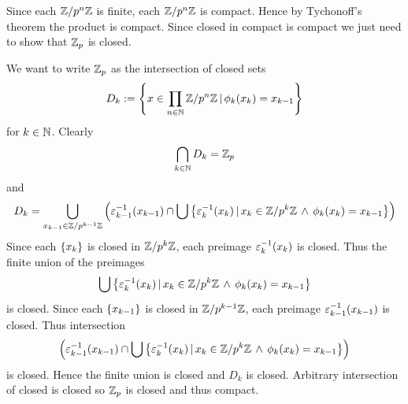 \begin{prop}[$\Z_p$ is compact]
    Since each $\mathbb{Z}/p^{n}\mathbb{Z}$ is finite, 
    each $\mathbb{Z}/p^{n}\mathbb{Z}$ is compact.
    Hence by Tychonoff's theorem
    the product is compact.
    Since closed in compact is compact
    we just need to show that $\Z_p$ is closed.

    We want to write $\Z_p$ as the intersection of 
    closed sets 
    \[D_k:= \left\{x \in \prod_{n\in\mathbb{N}} \mathbb{Z}/p^{n}\mathbb{Z} \,|\, \phi_k (x_k) = x_{k-1}\right\}\]
    for $k \in \mathbb{N}$.
    Clearly 
    \[\bigcap_{k\in\mathbb{N}} D_k = \mathbb{Z}_p\]
    and 
    \[D_k = \bigcup_{x_{k-1} \in \mathbb{Z}/p^{k-1}\mathbb{Z}} \left(\varepsilon_{k-1}^{-1}(x_{k-1}) 
    \cap \bigcup 
    \left\{\varepsilon_k^{-1}(x_k) \,|\, x_k \in \mathbb{Z}/p^{k}\mathbb{Z} \, \land \, \phi_k(x_k) = x_{k-1}\right\}\right)\]
    Since each $\left\{x_k\right\}$ is closed in $\mathbb{Z}/p^{k}\mathbb{Z}$, 
    each preimage $\varepsilon_k^{-1}(x_k)$ is closed.
    Thus the finite union of the preimages
    \[\bigcup 
    \left\{\varepsilon_k^{-1}(x_k) \,|\, x_k \in \mathbb{Z}/p^{k}\mathbb{Z} \, \land \, \phi_k(x_k) = x_{k-1}\right\}\]
    is closed.
    Since each $\left\{x_{k-1}\right\}$ is closed in $\mathbb{Z}/p^{k-1}\mathbb{Z}$, 
    each preimage $\varepsilon_{k-1}^{-1}(x_{k-1})$ is closed.
    Thus intersection 
    \[\left(\varepsilon_{k-1}^{-1}(x_{k-1}) 
    \cap \bigcup 
    \left\{\varepsilon_k^{-1}(x_k) \,|\, x_k \in \mathbb{Z}/p^{k}\mathbb{Z} \, \land \, \phi_k(x_k) = x_{k-1}\right\}\right)\]
    is closed.
    Hence the finite union is closed and $D_k$ is closed.
    Arbitrary intersection of closed is closed so $\Z_p$ 
    is closed and thus compact.
\end{prop}

